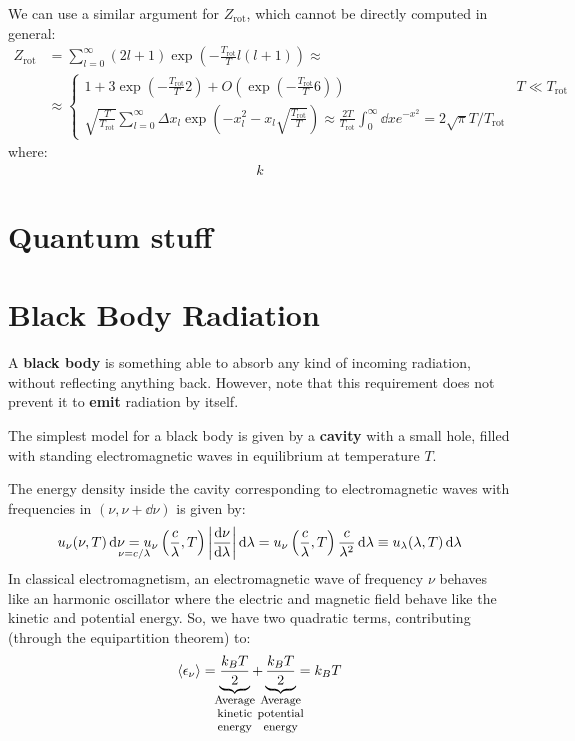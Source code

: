 \documentclass[../template.tex]{subfiles}
\begin{document}
We can use a similar argument for $Z_{\mathrm{rot}}$, which cannot be directly computed in general:
\begin{align*}
    Z_{\mathrm{rot}} &= \sum_{l=0}^{\infty} (2l+1) \exp\left(-\frac{T_{\mathrm{rot} }}{T} l(l+1) \right) \approx\\
    &\approx \begin{cases}
        1 + 3 \exp\left(-\frac{T_{\mathrm{rot} }}{T} 2 \right) + O\left(\exp\left(-\frac{T_{\mathrm{rot} }}{T} 6\right)\right) & T \ll T_{\mathrm{rot}}\\
        \sqrt{\frac{T}{T_{\mathrm{rot}}} } \sum_{l=0}^{\infty} \Delta x_l \exp\left({-x_l^2} - x_l \sqrt{\frac{T_{\mathrm{rot} }}{T} }\right) \approx \frac{2T}{T_{\mathrm{rot}}} \int_0^\infty \dd{x} e^{-x^2} = 2 \sqrt{\pi} T/T_{\mathrm{rot}} 
    \end{cases}
\end{align*}
where:
\begin{align*}
    k
\end{align*}

\section{Quantum stuff}

\section{Black Body Radiation}
A \textbf{black body} is something able to absorb any kind of incoming radiation, without reflecting anything back. However, note that this requirement does not prevent it to \textbf{emit} radiation by itself.

\medskip

The simplest model for a black body is given by a \textbf{cavity} with a small hole, filled with standing electromagnetic waves in equilibrium at temperature $T$. 

\medskip

The energy density inside the cavity corresponding to electromagnetic waves with frequencies in $(\nu, \nu+\dd{\nu})$ is given by:
\begin{align*}
    u_{\nu}(\nu, T) \dd{\nu} \underset{\mathclap{\nu = c/\lambda}}{=}  u_\nu \left(\frac{c}{\lambda}, T \right) \left|\dv{\nu}{\lambda}\right|\dd{\lambda} = u_{\nu} \left(\frac{c}{\lambda}, T \right) \frac{c}{\lambda^2} \dd{\lambda} \equiv u_{\lambda}(\lambda, T) \dd{\lambda} 
\end{align*}
In classical electromagnetism, an electromagnetic wave of frequency $\nu$ behaves like an harmonic oscillator where the electric and magnetic field behave like the kinetic and potential energy. So, we have two quadratic terms, contributing (through the equipartition theorem) to:
\begin{align*}
    \langle \epsilon_\nu \rangle = \underbrace{\frac{k_B T}{2}}_{\mathclap{\parbox{5em}{\footnotesize\centering Average kinetic energy}}}  + \underbrace{\frac{k_B T}{2}}_{\mathclap{\parbox{5em}{\footnotesize\centering Average potential energy}}}   = k_B T  
\end{align*}
\end{document}
